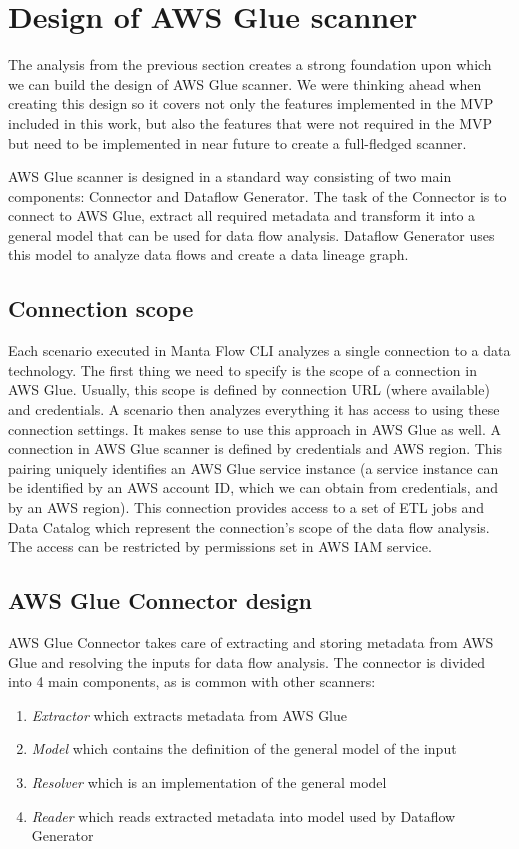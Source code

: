 \section{Design of AWS Glue scanner}

The analysis from the previous section creates a strong foundation upon which we can build the design of AWS Glue scanner. We were thinking ahead when creating this design so it covers not only the features implemented in the MVP included in this work, but also the features that were not required in the MVP but need to be implemented in near future to create a full-fledged scanner.
\par
AWS Glue scanner is designed in a standard way consisting of two main components: Connector and Dataflow Generator. The task of the Connector is to connect to AWS Glue, extract all required metadata and transform it into a general model that can be used for data flow analysis. Dataflow Generator uses this model to analyze data flows and create a data lineage graph. 

\subsection{Connection scope}
Each scenario executed in Manta Flow CLI analyzes a single connection to a data technology. The first thing we need to specify is the scope of a connection in AWS Glue. Usually, this scope is defined by connection URL (where available) and credentials. A scenario then analyzes everything it has access to using these connection settings. It makes sense to use this approach in AWS Glue as well. A connection in AWS Glue scanner is defined by credentials and AWS region. This pairing uniquely identifies an AWS Glue service instance (a service instance can be identified by an AWS account ID, which we can obtain from credentials, and by an AWS region). This connection provides access to a set of ETL jobs and Data Catalog which represent the connection's scope of the data flow analysis. The access can be restricted by permissions set in AWS IAM service.

\subsection{AWS Glue Connector design}
AWS Glue Connector takes care of extracting and storing metadata from AWS Glue and resolving the inputs for data flow analysis. The connector is divided into 4 main components, as is common with other scanners:
\begin{enumerate}
    \item \textit{Extractor} which extracts metadata from AWS Glue
    \item \textit{Model} which contains the definition of the general model of the input
    \item \textit{Resolver} which is an implementation of the general model
    \item \textit{Reader} which reads extracted metadata into model used by Dataflow Generator
\end{enumerate}

